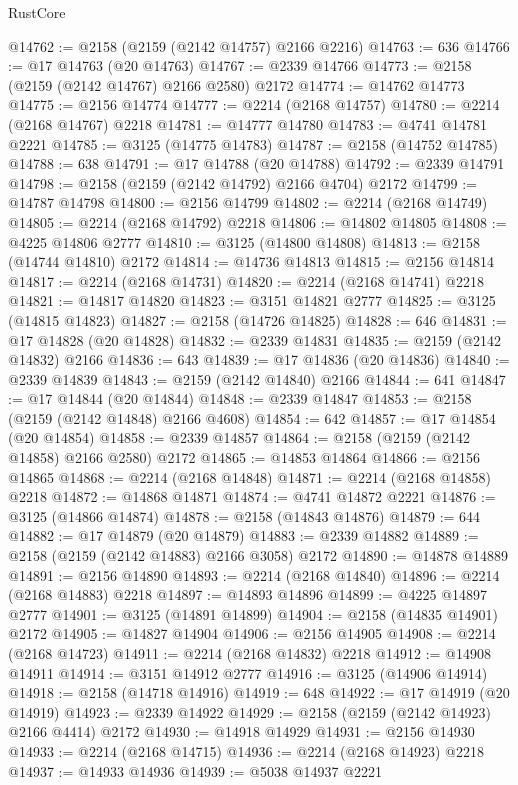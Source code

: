 \begin{lexlean}{RustCore}
\begin{coremodule}
@14762 := @2158 (@2159 (@2142 @14757) @2166 @2216)
@14763 := 636
@14766 := @17 @14763 (@20 @14763)
@14767 := @2339 @14766
@14773 := @2158 (@2159 (@2142 @14767) @2166 @2580) @2172
@14774 := @14762 @14773
@14775 := @2156 @14774
@14777 := @2214 (@2168 @14757)
@14780 := @2214 (@2168 @14767) @2218
@14781 := @14777 @14780
@14783 := @4741 @14781 @2221
@14785 := @3125 (@14775 @14783)
@14787 := @2158 (@14752 @14785)
@14788 := 638
@14791 := @17 @14788 (@20 @14788)
@14792 := @2339 @14791
@14798 := @2158 (@2159 (@2142 @14792) @2166 @4704) @2172
@14799 := @14787 @14798
@14800 := @2156 @14799
@14802 := @2214 (@2168 @14749)
@14805 := @2214 (@2168 @14792) @2218
@14806 := @14802 @14805
@14808 := @4225 @14806 @2777
@14810 := @3125 (@14800 @14808)
@14813 := @2158 (@14744 @14810) @2172
@14814 := @14736 @14813
@14815 := @2156 @14814
@14817 := @2214 (@2168 @14731)
@14820 := @2214 (@2168 @14741) @2218
@14821 := @14817 @14820
@14823 := @3151 @14821 @2777
@14825 := @3125 (@14815 @14823)
@14827 := @2158 (@14726 @14825)
@14828 := 646
@14831 := @17 @14828 (@20 @14828)
@14832 := @2339 @14831
@14835 := @2159 (@2142 @14832) @2166
@14836 := 643
@14839 := @17 @14836 (@20 @14836)
@14840 := @2339 @14839
@14843 := @2159 (@2142 @14840) @2166
@14844 := 641
@14847 := @17 @14844 (@20 @14844)
@14848 := @2339 @14847
@14853 := @2158 (@2159 (@2142 @14848) @2166 @4608)
@14854 := 642
@14857 := @17 @14854 (@20 @14854)
@14858 := @2339 @14857
@14864 := @2158 (@2159 (@2142 @14858) @2166 @2580) @2172
@14865 := @14853 @14864
@14866 := @2156 @14865
@14868 := @2214 (@2168 @14848)
@14871 := @2214 (@2168 @14858) @2218
@14872 := @14868 @14871
@14874 := @4741 @14872 @2221
@14876 := @3125 (@14866 @14874)
@14878 := @2158 (@14843 @14876)
@14879 := 644
@14882 := @17 @14879 (@20 @14879)
@14883 := @2339 @14882
@14889 := @2158 (@2159 (@2142 @14883) @2166 @3058) @2172
@14890 := @14878 @14889
@14891 := @2156 @14890
@14893 := @2214 (@2168 @14840)
@14896 := @2214 (@2168 @14883) @2218
@14897 := @14893 @14896
@14899 := @4225 @14897 @2777
@14901 := @3125 (@14891 @14899)
@14904 := @2158 (@14835 @14901) @2172
@14905 := @14827 @14904
@14906 := @2156 @14905
@14908 := @2214 (@2168 @14723)
@14911 := @2214 (@2168 @14832) @2218
@14912 := @14908 @14911
@14914 := @3151 @14912 @2777
@14916 := @3125 (@14906 @14914)
@14918 := @2158 (@14718 @14916)
@14919 := 648
@14922 := @17 @14919 (@20 @14919)
@14923 := @2339 @14922
@14929 := @2158 (@2159 (@2142 @14923) @2166 @4414) @2172
@14930 := @14918 @14929
@14931 := @2156 @14930
@14933 := @2214 (@2168 @14715)
@14936 := @2214 (@2168 @14923) @2218
@14937 := @14933 @14936
@14939 := @5038 @14937 @2221

\end{coremodule}
\end{lexlean}
